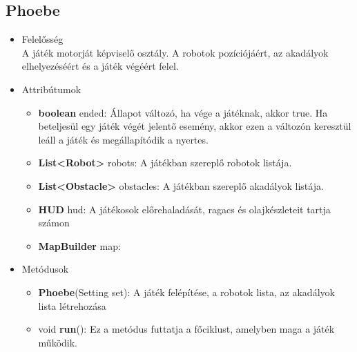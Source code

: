 \subsection{Phoebe}
\begin{itemize}
\item Felelősség\\
A játék motorját képviselő osztály. A robotok pozíciójáért, az akadályok elhelyezéséért és a játék végéért felel.
\item Attribútumok
	\begin{itemize}
		\item \textbf{boolean} ended: Állapot változó, ha vége a játéknak, akkor true. Ha beteljesül egy játék végét jelentő esemény, akkor ezen a változón keresztül leáll a játék és megállapítódik a nyertes.
		\item \textbf{List<Robot>} robots: A játékban szereplő robotok listája.
		\item \textbf{List<Obstacle>} obstacles: A játékban szereplő akadályok listája.
		\item \textbf{HUD} hud: A játékosok előrehaladását, ragacs és olajkészleteit tartja számon
		\item \textbf{MapBuilder} map: 
	\end{itemize}
\item Metódusok
	\begin{itemize}
		\item \textbf{Phoebe}(Setting set): A játék felépítése, a robotok lista, az akadályok lista létrehozása
		\item void \textbf{run}(): Ez a metódus futtatja a főciklust, amelyben maga a játék működik.
	\end{itemize}
\end{itemize}

